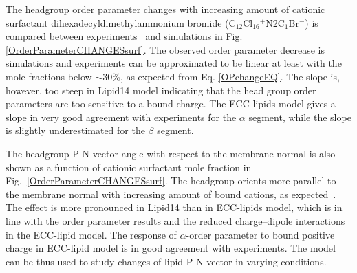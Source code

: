 \documentclass[aip,jcp,twocolumn]{revtex4}
\begin{document}
%

The headgroup order parameter changes with increasing amount of 
cationic surfactant dihexadecyldimethylammonium bromide (C$_{12}$Cl$_{16}$$^+$N2C$_1$Br$^-$) 
is compared between experiments~\cite{scherer89} and simulations in
Fig. \ref{OrderParameterCHANGESsurf}. 
The observed order parameter decrease is simulations and experiments
can be approximated to be linear at least with the mole fractions
below $\sim$30\%, as expected from Eq. \ref{OPchangeEQ}.
The slope is, however, too steep in Lipid14 model indicating that 
the head group order parameters are too sensitive to a bound charge.
The ECC-lipids model gives a slope in very good agreement with experiments
for the $\alpha$ segment, while the slope is slightly
underestimated for the $\beta$ segment.

The headgroup P-N vector angle with respect to the membrane normal
is also shown as a function of cationic surfactant mole fraction
in Fig.~\ref{OrderParameterCHANGESsurf}.
The headgroup orients more parallel to the membrane
normal with increasing amount of bound cations, as expected~\cite{seelig87}. 
The effect is more pronounced in Lipid14 than 
in ECC-lipids model, which is in line with the order parameter 
results and the reduced charge--dipole interactions in the ECC-lipid model.
The response of $\alpha$-order parameter to bound positive charge
in ECC-lipid model is in good agreement with experiments.
The model can be thus used to study changes of lipid P-N vector
in varying conditions.
\end{document}
